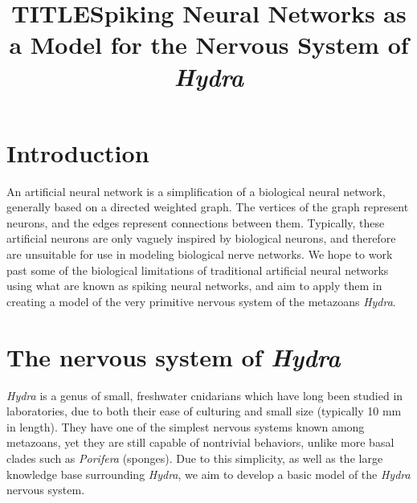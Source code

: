 \documentclass{article}
\date{}
\title{TITLE}
\title{Spiking Neural Networks as a Model for the Nervous System of \textit{Hydra}}
\begin{document}
\maketitle

\section{Introduction}

An artificial neural network is a simplification of a biological neural network, generally based on a directed weighted graph. The vertices of the graph represent neurons, and the edges represent connections between them. Typically, these artificial neurons are only vaguely inspired by biological neurons, and therefore are unsuitable for use in modeling biological nerve networks. We hope to work past some of the biological limitations of traditional artificial neural networks using what are known as spiking neural networks, and aim to apply them in creating a model of the very primitive nervous system of the metazoans \textit{Hydra}.


\section{The nervous system of \textit{Hydra}}
\textit{Hydra} is a genus of small, freshwater cnidarians which have long been studied in laboratories, due to both their ease of culturing and small size (typically 10 mm in length). They have one of the simplest nervous systems known among metazoans, yet they are still capable of nontrivial behaviors, unlike more basal clades such as \textit{Porifera} (sponges). Due to this simplicity, as well as the large knowledge base surrounding \textit{Hydra}, we aim to develop a basic model of the \textit{Hydra} nervous system.
\end{document}
